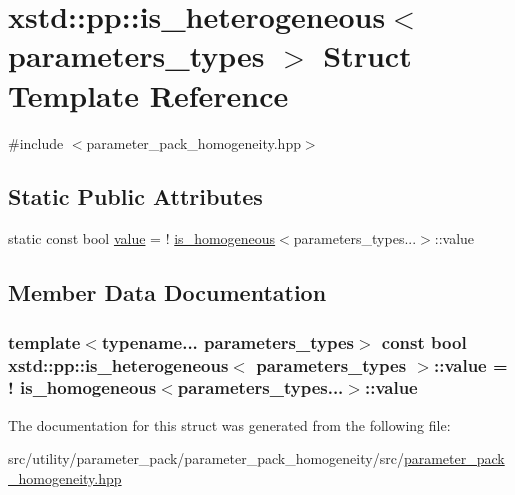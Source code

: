\hypertarget{structxstd_1_1pp_1_1is__heterogeneous}{\section{xstd\-:\-:pp\-:\-:is\-\_\-heterogeneous$<$ parameters\-\_\-types $>$ Struct Template Reference}
\label{structxstd_1_1pp_1_1is__heterogeneous}
}


{\ttfamily \#include $<$parameter\-\_\-pack\-\_\-homogeneity.\-hpp$>$}

\subsection*{Static Public Attributes}
\begin{DoxyCompactItemize}
\item 
static const bool \hyperlink{structxstd_1_1pp_1_1is__heterogeneous_a790c8cb5a84cf3da91bf1602e181105b}{value} = ! \hyperlink{structxstd_1_1pp_1_1is__homogeneous}{is\-\_\-homogeneous}$<$parameters\-\_\-types...$>$\-::value
\end{DoxyCompactItemize}


\subsection{Member Data Documentation}
\hypertarget{structxstd_1_1pp_1_1is__heterogeneous_a790c8cb5a84cf3da91bf1602e181105b}{
\subsubsection[{value}]{\setlength{\rightskip}{0pt plus 5cm}template$<$typename... parameters\-\_\-types$>$ const bool {\bf xstd\-::pp\-::is\-\_\-heterogeneous}$<$ parameters\-\_\-types $>$\-::value = ! {\bf is\-\_\-homogeneous}$<$parameters\-\_\-types...$>$\-::value\hspace{0.3cm}{\ttfamily [static]}}}\label{structxstd_1_1pp_1_1is__heterogeneous_a790c8cb5a84cf3da91bf1602e181105b}


The documentation for this struct was generated from the following file\-:\begin{DoxyCompactItemize}
\item 
src/utility/parameter\-\_\-pack/parameter\-\_\-pack\-\_\-homogeneity/src/\hyperlink{parameter__pack__homogeneity_8hpp}{parameter\-\_\-pack\-\_\-homogeneity.\-hpp}\end{DoxyCompactItemize}
